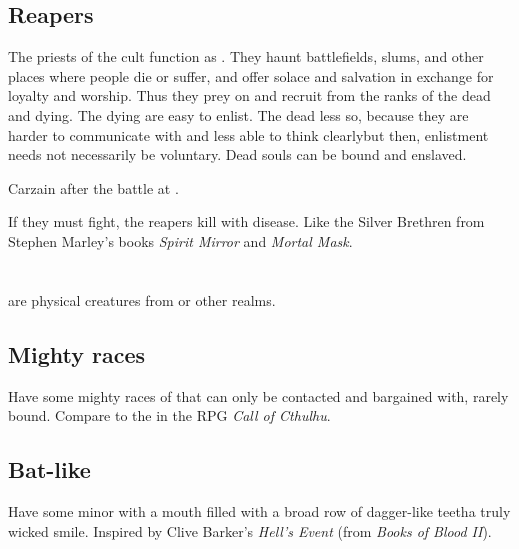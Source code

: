 \subsection{Reapers}
\label{Worm Cult reapers}
The priests of the cult function as . They haunt battlefields, slums,  and other places where people die or suffer, and offer solace and salvation in exchange for loyalty and worship. Thus they prey on and recruit from the ranks of the dead and dying. The dying are easy to enlist. The dead less so, because they are harder to communicate with and less able to think clearly\dash but then, enlistment needs not necessarily be voluntary. Dead souls can be bound and enslaved.

Carzain  after the battle at \Forklin.

If they must fight, the reapers kill with disease. Like the Silver Brethren from Stephen Marley's books \emph{Spirit Mirror} and \emph{Mortal Mask}. 


















\section{\PDaemons}
\Pdaemons{} are physical creatures from \Machai{} or other \chaotic{} realms. 





\subsection{Mighty \daemonic{} races}
Have some mighty races of \daemons{} that can only be contacted and bargained with, rarely bound. Compare to the  in the RPG \emph{Call of Cthulhu}. 





\subsection{Bat-like \daemon}
Have some minor \pdaemons{} with a mouth filled with a broad row of dagger-like teeth\dash a truly wicked smile. Inspired by Clive Barker's \emph{Hell's Event} (from \emph{Books of Blood II}). 

